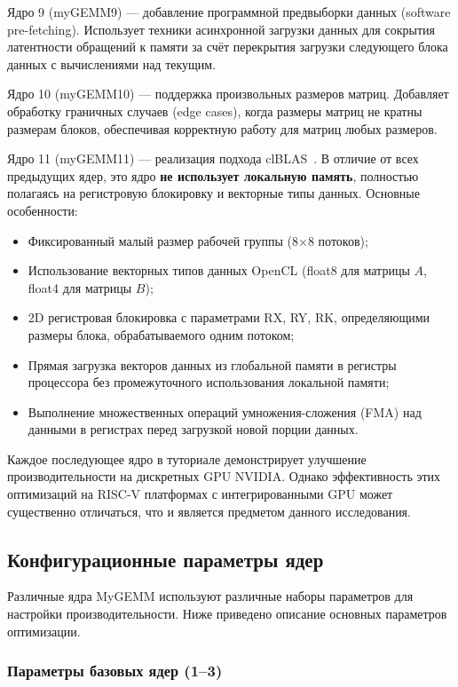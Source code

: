 Ядро 9 (myGEMM9) --- добавление программной предвыборки данных (software pre-fetching). Использует техники асинхронной загрузки данных для сокрытия латентности обращений к памяти за счёт перекрытия загрузки следующего блока данных с вычислениями над текущим.

Ядро 10 (myGEMM10) --- поддержка произвольных размеров матриц. Добавляет обработку граничных случаев (edge cases), когда размеры матриц не кратны размерам блоков, обеспечивая корректную работу для матриц любых размеров.

Ядро 11 (myGEMM11) --- реализация подхода clBLAS~\cite{clblas2015}. В отличие от всех предыдущих ядер, это ядро \textbf{не использует локальную память}, полностью полагаясь на регистровую блокировку и векторные типы данных. Основные особенности:

\begin{itemize}
    \item Фиксированный малый размер рабочей группы (8×8 потоков);
    \item Использование векторных типов данных OpenCL (float8 для матрицы $A$, float4 для матрицы $B$);
    \item 2D регистровая блокировка с параметрами RX, RY, RK, определяющими размеры блока, обрабатываемого одним потоком;
    \item Прямая загрузка векторов данных из глобальной памяти в регистры процессора без промежуточного использования локальной памяти;
    \item Выполнение множественных операций умножения-сложения (FMA) над данными в регистрах перед загрузкой новой порции данных.
\end{itemize}

Каждое последующее ядро в туториале демонстрирует улучшение производительности на дискретных GPU NVIDIA. Однако эффективность этих оптимизаций на RISC-V платформах с интегрированными GPU может существенно отличаться, что и является предметом данного исследования.

\subsection{Конфигурационные параметры ядер}

Различные ядра MyGEMM используют различные наборы параметров для настройки производительности. Ниже приведено описание основных параметров оптимизации.

\subsubsection{Параметры базовых ядер (1--3)}

